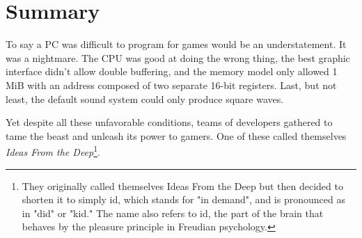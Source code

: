 \documentclass[book.tex]{subfiles}
\begin{document}
\section{Summary}
To say a PC was difficult to program for games would be an understatement. It was a nightmare. The CPU was good at doing the wrong thing, the best graphic interface didn't allow double buffering, and the memory model only allowed 1 MiB with an address composed of two separate 16-bit registers. Last, but not least, the default sound system could only produce square waves.\\
\par
Yet despite all these unfavorable conditions, teams of developers gathered to tame the beast and unleash its power to gamers. One of these called themselves \textit{Ideas From the Deep}\footnote{They originally called themselves Ideas From the Deep but then decided to shorten it to simply id, which stands for "in demand", and is pronounced as in "did" or "kid." The name also refers to id, the part of the brain that behaves by the pleasure principle in Freudian psychology.}.
\end{document}
